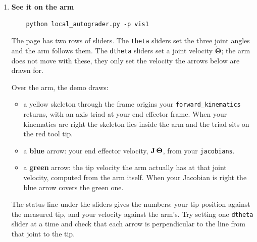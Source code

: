 \documentclass{16384_doc}
\begin{document}
\begin{questions}
\begin{enumerate}  [label=\alph*.]
        Fill in \verb!compute_joint_torques! in \verb!ex1/jacobian_example.py!:
        it takes a robot, its joint angles and a wrench, and returns
        $\Jt \mathbf{w}$ for the end effector Jacobian. Running the script
        (\verb!cd ex1; python jacobian_example.py!) builds the 10R arm above and
        prints the torques.

        (Just for fun, imagine the number of terms for the analytic Jacobian for
        this arm. If you could write that out the very first time without making
        a mistake or a sign error, you might be the first person to ever do
        so\ldots)

        \item \textbf{See it on the arm}

\begin{verbatim}
    python local_autograder.py -p vis1
\end{verbatim}

        The page has two rows of sliders. The \verb!theta! sliders set the three
        joint angles and the arm follows them. The \verb!dtheta! sliders set a
        joint velocity $\dot{\mathbf{\Theta}}$; the arm does not move with these,
        they only set the velocity the arrows below are drawn for.

        Over the arm, the demo draws:
        \begin{itemize}
            \item a yellow skeleton through the frame origins your
                \verb!forward_kinematics! returns, with an axis triad at your
                end effector frame. When your kinematics are right the skeleton
                lies inside the arm and the triad sits on the red tool tip.
            \item a \textbf{blue} arrow: your end effector velocity,
                $\mathbf{J}\,\dot{\mathbf{\Theta}}$, from your \verb!jacobians!.
            \item a \textbf{green} arrow: the tip velocity the arm actually has
                at that joint velocity, computed from the arm itself. When your
                Jacobian is right the blue arrow covers the green one.
        \end{itemize}

        The status line under the sliders gives the numbers: your tip position
        against the measured tip, and your velocity against the arm's. Try
        setting one \verb!dtheta! slider at a time and check that each arrow is
        perpendicular to the line from that joint to the tip.


\end{enumerate}
\end{questions}
\end{document}
